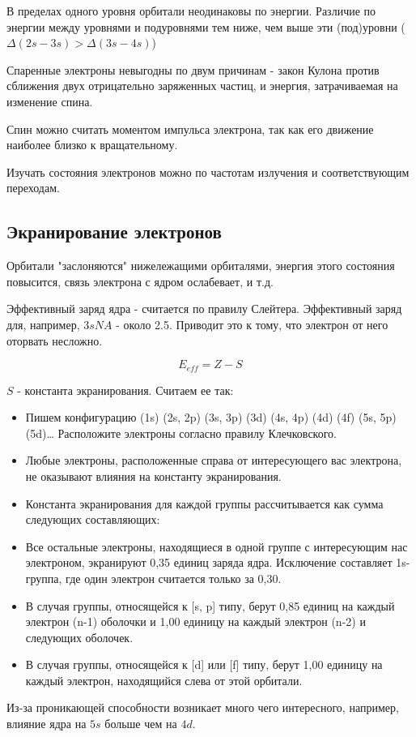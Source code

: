 \documentclass[11pt]{article}
\begin{document}
В пределах одного уровня орбитали неодинаковы по энергии. Различие по энергии между уровнями и подуровнями тем ниже, чем выше эти (под)уровни ($\Delta(2s-3s)>\Delta(3s-4s)$)

Спаренные электроны невыгодны по двум причинам - закон Кулона против сближения двух отрицательно заряженных частиц, и энергия, затрачиваемая на изменение спина.

Спин можно считать моментом импульса электрона, так как его движение наиболее близко к вращательному.

Изучать состояния электронов можно по частотам излучения и соответствующим переходам.
\subsection*{Экранирование электронов}
Орбитали "заслоняются" нижележащими орбиталями, энергия этого состояния повысится, связь электрона с ядром ослабевает, и т.д.

Эффективный заряд ядра - считается по правилу Слейтера. Эффективный заряд для, например, $3s NA$ - около 2.5. Приводит это к тому, что электрон от него оторвать несложно.

$$E_{eff} = Z - S$$

$S$ - константа экранирования.
Считаем ее так:
\begin{itemize}
\item Пишем конфигурацию
(1s) (2s, 2p) (3s, 3p) (3d) (4s, 4p) (4d) (4f) (5s, 5p) (5d)…
Расположите электроны согласно правилу Клечковского.
\item Любые электроны, расположенные справа от интересующего вас электрона, не оказывают влияния на константу экранирования.
\item Константа экранирования для каждой группы рассчитывается как сумма следующих составляющих:
\item Все остальные электроны, находящиеся в одной группе с интересующим нас электроном, экранируют 0,35 единиц заряда ядра. Исключение составляет 1s-группа, где один электрон считается только за 0,30.
\item В случая группы, относящейся к [s, p] типу, берут 0,85 единиц на каждый электрон (n-1) оболочки и 1,00 единицу на каждый электрон (n-2) и следующих оболочек.
\item В случая группы, относящейся к [d] или [f] типу, берут 1,00 единицу на каждый электрон, находящийся слева от этой орбитали.
\end{itemize}

Из-за проникающей способности возникает много чего интересного, например, влияние ядра на $5s$ больше чем на $4d$.
\end{document}
